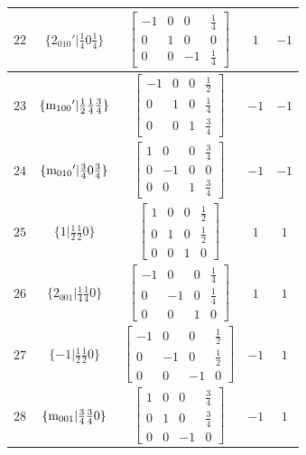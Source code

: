 \documentclass[fleqn,8pt]{jsarticle}
\begin{document}
\begin{longtable}{ccccc}
$ 22 $ & $ \{2{}_{010}{}'|\frac{1}{4} 0 \frac{1}{4}\} $ & $ \begin{bmatrix} -1 & 0 & 0 & \frac{1}{4} \\ 0 & 1 & 0 & 0 \\ 0 & 0 & -1 & \frac{1}{4} \end{bmatrix} $ & $ 1 $ & $ -1 $ \\ \hline
$ 23 $ & $ \{{\rm m}_{100}{}'|\frac{1}{2} \frac{1}{4} \frac{3}{4}\} $ & $ \begin{bmatrix} -1 & 0 & 0 & \frac{1}{2} \\ 0 & 1 & 0 & \frac{1}{4} \\ 0 & 0 & 1 & \frac{3}{4} \end{bmatrix} $ & $ -1 $ & $ -1 $ \\ \hline
$ 24 $ & $ \{{\rm m}_{010}{}'|\frac{3}{4} 0 \frac{3}{4}\} $ & $ \begin{bmatrix} 1 & 0 & 0 & \frac{3}{4} \\ 0 & -1 & 0 & 0 \\ 0 & 0 & 1 & \frac{3}{4} \end{bmatrix} $ & $ -1 $ & $ -1 $ \\ \hline
$ 25 $ & $ \{1|\frac{1}{2} \frac{1}{2} 0\} $ & $ \begin{bmatrix} 1 & 0 & 0 & \frac{1}{2} \\ 0 & 1 & 0 & \frac{1}{2} \\ 0 & 0 & 1 & 0 \end{bmatrix} $ & $ 1 $ & $ 1 $ \\ \hline
$ 26 $ & $ \{2{}_{001}|\frac{1}{4} \frac{1}{4} 0\} $ & $ \begin{bmatrix} -1 & 0 & 0 & \frac{1}{4} \\ 0 & -1 & 0 & \frac{1}{4} \\ 0 & 0 & 1 & 0 \end{bmatrix} $ & $ 1 $ & $ 1 $ \\ \hline
$ 27 $ & $ \{-1|\frac{1}{2} \frac{1}{2} 0\} $ & $ \begin{bmatrix} -1 & 0 & 0 & \frac{1}{2} \\ 0 & -1 & 0 & \frac{1}{2} \\ 0 & 0 & -1 & 0 \end{bmatrix} $ & $ -1 $ & $ 1 $ \\ \hline
$ 28 $ & $ \{{\rm m}_{001}|\frac{3}{4} \frac{3}{4} 0\} $ & $ \begin{bmatrix} 1 & 0 & 0 & \frac{3}{4} \\ 0 & 1 & 0 & \frac{3}{4} \\ 0 & 0 & -1 & 0 \end{bmatrix} $ & $ -1 $ & $ 1 $ \\ \hline

\end{longtable}
\end{document}
